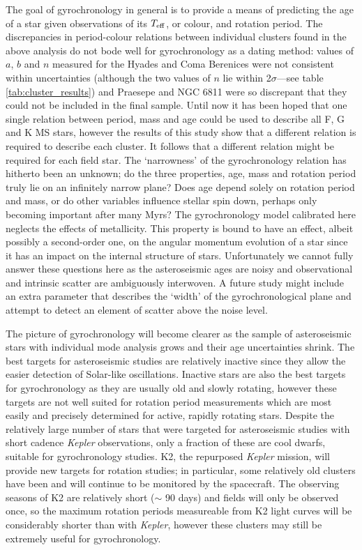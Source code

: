 \documentclass[11pt,preprint]{aastex}
\newcommand{\teff}{$T_{\rm{eff}}$}
\begin{document}
The goal of gyrochronology in general is to provide a means of predicting the age of a star given observations of its \teff, or colour, and rotation period.
The discrepancies in period-colour relations between individual clusters found in the above analysis do not bode well for gyrochronology as a dating method: values of $a$, $b$ and $n$ measured for the Hyades and Coma Berenices were not consistent within uncertainties (although the two values of $n$ lie within 2$\sigma$---see table \ref{tab:cluster_results}) and Praesepe and NGC 6811 were so discrepant that they could not be included in the final sample.
Until now it has been hoped that one single relation between period, mass and age could be used to describe all F, G and K MS stars, however the results of this study show that a different relation is required to describe each cluster.
It follows that a different relation might be required for each field star.
The `narrowness' of the gyrochronology relation has hitherto been an unknown; do the three properties, age, mass and rotation period truly lie on an infinitely narrow plane?
Does age depend solely on rotation period and mass, or do other variables influence stellar spin down, perhaps only becoming important after many Myrs?
The gyrochronology model calibrated here neglects the effects of metallicity.
This property is bound to have an effect, albeit possibly a second-order one, on the angular momentum evolution of a star since it has an impact on the internal structure of stars.
Unfortunately we cannot fully answer these questions here as the asteroseismic ages are noisy and observational and intrinsic scatter are ambiguously interwoven.
A future study might include an extra parameter that describes the `width' of the gyrochronological plane and attempt to detect an element of scatter above the noise level.

The picture of gyrochronology will become clearer as the sample of asteroseismic stars with individual mode analysis grows and their age uncertainties shrink.
The best targets for asteroseismic studies are relatively inactive since they allow the easier detection of Solar-like oscillations.
Inactive stars are also the best targets for gyrochronology as they are usually old and slowly rotating, however these targets are not well suited for rotation period measurements which are most easily and precisely determined for active, rapidly rotating stars.
Despite the relatively large number of stars that were targeted for asteroseismic studies with short cadence {\it Kepler} observations, only a fraction of these are cool dwarfs, suitable for gyrochronology studies.
K2, the repurposed {\it Kepler} mission, will provide new targets for rotation studies; in particular, some relatively old clusters have been and will continue to be monitored by the spacecraft.
The observing seasons of K2 are relatively short ($\sim$ 90 days) and fields will only be observed once, so the maximum rotation periods measureable from K2 light curves will be considerably shorter than with {\it Kepler}, however these clusters may still be extremely useful for gyrochronology.
\end{document}
